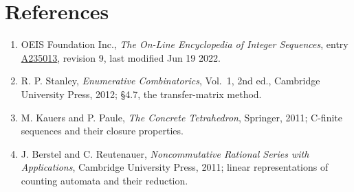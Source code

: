 \documentclass[11pt]{article}
\theoremstyle{definition}
\begin{document}
\section{References}

\begin{enumerate}

\item OEIS Foundation Inc., \emph{The On-Line Encyclopedia of Integer Sequences}, entry \href{https://oeis.org/A235013}{A235013}, revision 9, last modified Jun 19 2022.

\item R. P. Stanley, \emph{Enumerative Combinatorics}, Vol.~1, 2nd ed., Cambridge University Press, 2012; \S4.7, the transfer-matrix method.

\item M. Kauers and P. Paule, \emph{The Concrete Tetrahedron}, Springer, 2011; C-finite sequences and their closure properties.

\item J. Berstel and C. Reutenauer, \emph{Noncommutative Rational Series with Applications}, Cambridge University Press, 2011; linear representations of counting automata and their reduction.

\end{enumerate}
\end{document}
